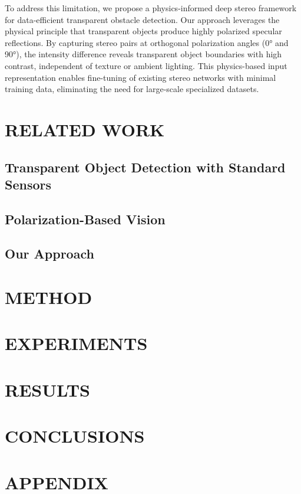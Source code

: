 \documentclass[letterpaper, 10 pt, conference]{ieeeconf}  %
\begin{document}
To address this limitation, we propose a physics-informed deep stereo 
framework for data-efficient transparent obstacle detection. Our approach 
leverages the physical principle that transparent objects produce highly 
polarized specular reflections. By capturing stereo pairs at orthogonal 
polarization angles (0° and 90°), the intensity difference reveals transparent 
object boundaries with high contrast, independent of texture or ambient lighting. 
This physics-based input representation enables fine-tuning of existing stereo 
networks with minimal training data, eliminating the need for large-scale 
specialized datasets.

\section{RELATED WORK}

\subsection{Transparent Object Detection with Standard Sensors}



\subsection{Polarization-Based Vision}
\subsection{Our Approach}

\section{METHOD}
\section{EXPERIMENTS}
\section{RESULTS}
\section{CONCLUSIONS}
\section*{APPENDIX}

\end{document}
